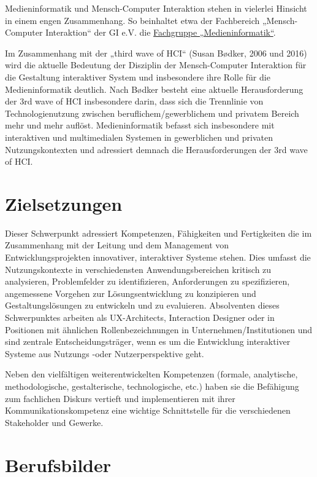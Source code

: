 Medieninformatik und Mensch-Computer Interaktion stehen in vielerlei
Hinsicht in einem engen Zusammenhang. So beinhaltet etwa der Fachbereich
„Mensch-Computer Interaktion`` der GI e.V. die
\href{http://fb-mci.gi.de/mensch-computer-interaktion-mci/fachgruppen/medieninformatik.html}{Fachgruppe
„Medieninformatik``}.

Im Zusammenhang mit der „third wave of HCI`` (Susan Bødker, 2006 und
2016) wird die aktuelle Bedeutung der Disziplin der Mensch-Computer
Interaktion für die Gestaltung interaktiver System und insbesondere ihre
Rolle für die Medieninformatik deutlich. Nach Bødker besteht eine
aktuelle Herausforderung der 3rd wave of HCI insbesondere darin, dass
sich die Trennlinie von Technologienutzung zwischen
beruflichem/gewerblichem und privatem Bereich mehr und mehr auflöst.
Medieninformatik befasst sich insbesondere mit interaktiven und
multimedialen Systemen in gewerblichen und privaten Nutzungskontexten
und adressiert demnach die Herausforderungen der 3rd wave of HCI.

\section*{Zielsetzungen}\label{zielsetzungen}

Dieser Schwerpunkt adressiert Kompetenzen, Fähigkeiten und Fertigkeiten
die im Zusammenhang mit der Leitung und dem Management von
Entwicklungsprojekten innovativer, interaktiver Systeme stehen. Dies
umfasst die Nutzungskontexte in verschiedensten Anwendungsbereichen
kritisch zu analysieren, Problemfelder zu identifizieren, Anforderungen
zu spezifizieren, angemessene Vorgehen zur Lösungsentwicklung zu
konzipieren und Gestaltungslösungen zu entwickeln und zu evaluieren.
Absolventen dieses Schwerpunktes arbeiten als UX-Architects, Interaction
Designer oder in Positionen mit ähnlichen Rollenbezeichnungen in
Unternehmen/Institutionen und sind zentrale Entscheidungsträger, wenn es
um die Entwicklung interaktiver Systeme aus Nutzungs -oder
Nutzerperspektive geht.

Neben den vielfältigen weiterentwickelten Kompetenzen (formale,
analytische, methodologische, gestalterische, technologische, etc.)
haben sie die Befähigung zum fachlichen Diskurs vertieft und
implementieren mit ihrer Kommunikationskompetenz eine wichtige
Schnittstelle für die verschiedenen Stakeholder und Gewerke.

\section*{Berufsbilder}\label{berufsbilder}

